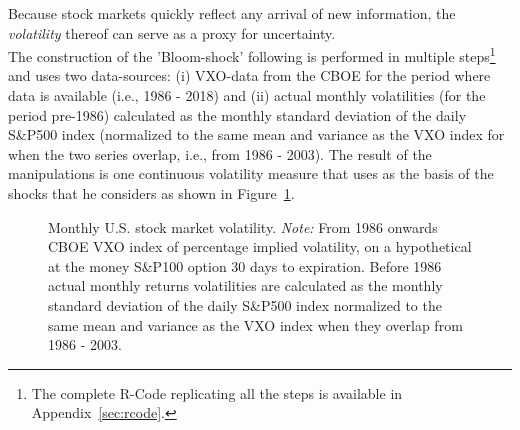 \documentclass[a4paper,12pt,oneside,pointednumbers,numbers=noenddot,bibtotoc,bigheadings,liststotoc,chapterprefix=true]{scrbook}
\begin{document}
Because stock markets quickly reflect any arrival of new information, the \textit{volatility} thereof can serve as a proxy for uncertainty. \\
The construction of the 'Bloom-shock' following \citet{bloom:09} is performed in multiple steps\footnote{The complete R-Code replicating all the steps is available in Appendix~\ref{sec:rcode}.} and uses two data-sources: (i) VXO-data from the CBOE for the period where data is available (i.e., 1986 - 2018) and (ii) actual monthly volatilities (for the period pre-1986) calculated as the monthly standard deviation of the daily S\&P500 index (normalized to the same mean and variance as the VXO index for when the two series overlap, i.e., from 1986 - 2003). The result of the manipulations is one continuous volatility measure that \citet{bloom:09} uses as the basis of the shocks that he considers as shown in Figure~\ref{fig:volatility}.
\begin{figure}[hbt]
   \centering
   \setlength\fboxsep{0pt}
   \setlength\fboxrule{0pt}
      \caption[Monthly U.S. stock market volatility.]{Monthly U.S. stock market volatility.
      \textit{Note:} From 1986 onwards CBOE VXO index of percentage implied volatility, on a hypothetical at the money S\&P100 option 30 days to expiration. Before 1986 actual monthly returns volatilities are calculated as the monthly standard deviation of the daily S\&P500 index normalized to the same mean and variance as the VXO index when they overlap from 1986 - 2003.}
   \label{fig:volatility}
\end{figure}
\end{document}

